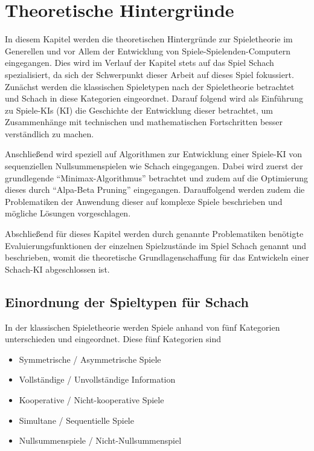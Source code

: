 
\chapter{Theoretische Hintergründe}\label{theoretische_hintergründe}
\nocite{*}

In diesem Kapitel werden die theoretischen Hintergründe zur Spieletheorie im Generellen und vor Allem der Entwicklung von Spiele-Spielenden-Computern eingegangen. Dies wird im Verlauf der Kapitel stets auf das Spiel Schach spezialisiert, da sich der Schwerpunkt dieser Arbeit auf dieses Spiel fokussiert. 
Zunächst werden die klassischen Spieletypen nach der Spieletheorie betrachtet und Schach in diese Kategorien eingeordnet. Darauf folgend wird als Einführung zu Spiele-\acs{KI}s (\acl{KI}) die Geschichte der Entwicklung dieser betrachtet, um Zusammenhänge mit technischen und mathematischen Fortschritten besser verständlich zu machen.

Anschließend wird speziell auf Algorithmen zur Entwicklung einer Spiele-KI von sequenziellen Nullsummenspielen wie Schach eingegangen. Dabei wird zuerst der grundlegende ``Minimax-Algorithmus'' betrachtet und zudem auf die Optimierung dieses durch ``Alpa-Beta Pruning'' eingegangen. Darauffolgend werden zudem die Problematiken der Anwendung dieser auf komplexe Spiele beschrieben und mögliche Lösungen vorgeschlagen. 

Abschließend für dieses Kapitel werden durch genannte Problematiken benötigte Evaluierungsfunktionen der einzelnen Spielzustände im Spiel Schach genannt und beschrieben, womit die theoretische Grundlagenschaffung für das Entwickeln einer Schach-KI abgeschlossen ist.

\section{Einordnung der Spieltypen für Schach} \label{game_types}

In der klassischen Spieletheorie werden Spiele anhand von fünf Kategorien unterschieden und eingeordnet. Diese fünf Kategorien sind
\begin{itemize}
\item Symmetrische / Asymmetrische Spiele
\item Vollständige / Unvollständige Information
\item Kooperative / Nicht-kooperative Spiele
\item Simultane / Sequentielle Spiele
\item Nullsummenspiele / Nicht-Nullsummenspiel \cite{Rodriguez}
\end{itemize} 

